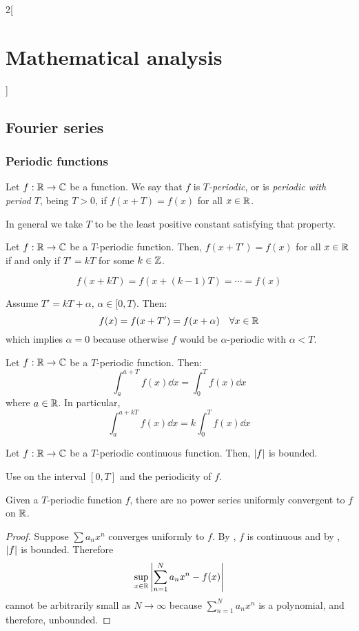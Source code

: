 \documentclass[../../../main_math.tex]{subfiles}
\begin{document}
\begin{multicols}{2}[\section{Mathematical analysis}]
  \subsection{Fourier series}\label{MA:fouriersection}
  \subsubsection{Periodic functions}
  \begin{definition}
    Let $f:\mathbb{R} \rightarrow\mathbb{C} $ be a function. We say that $f$ is \emph{$T$-periodic}, or is \emph{periodic with period $T$}, being $T>0$, if $f(x+T)=f(x)$ for all $x\in\mathbb{R} $.
  \end{definition}
  \begin{remark}
    In general we take $T$ to be the least positive constant satisfying that property.
  \end{remark}
  \begin{lemma}
    Let $f:\mathbb{R} \rightarrow\mathbb{C} $ be a $T$-periodic function. Then, $f(x+T')=f(x)$ for all $x\in\mathbb{R} $ if and only if $T'=kT$ for some $k\in\mathbb{Z} $.
  \end{lemma}
  \begin{sproof}
    \begin{itemizeiff}
      $$f(x+kT)=f(x+(k-1)T)=\cdots=f(x)$$
      \item Assume $T'=kT+\alpha$, $\alpha\in[0,T)$. Then:
      $$f(x)=f(x+T')=f(x+\alpha)\quad\forall x\in\mathbb{R}$$
      which implies $\alpha=0$ because otherwise $f$ would be $\alpha$-periodic with $\alpha<T$.
    \end{itemizeiff}
  \end{sproof}
  \begin{proposition}\label{MA:invarianceperiodicint}
    Let $f:\mathbb{R} \rightarrow\mathbb{C} $ be a $T$-periodic function. Then: $$\int_a^{a+T}f(x)\dd{x}=\int_0^Tf(x)\dd{x}$$ where $a\in\mathbb{R} $. In particular, $$\int_a^{a+kT}f(x)\dd{x}=k\int_0^Tf(x)\dd{x}$$
  \end{proposition}
  \begin{lemma}\label{MA:periodicbounded}
    Let $f:\mathbb{R} \rightarrow\mathbb{C} $ be a $T$-periodic continuous function. Then, $\abs{f}$ is bounded.
  \end{lemma}
  \begin{sproof}
    Use  on the interval $[0,T]$ and the periodicity of $f$.
  \end{sproof}
  \begin{proposition}
    Given a $T$-periodic function $f$, there are no power series uniformly convergent to $f$ on $\mathbb{R}$.
  \end{proposition}
  \begin{proof}
    Suppose $\sum a_nx^n$ converges uniformly to $f$. By , $f$ is continuous and by , $\abs{f}$ is bounded. Therefore $$\sup_{x\in\mathbb{R}}\left|\sum_{n=1}^{N}a_nx^n-f(x)\right|$$
    cannot be arbitrarily small as $N\to\infty$ because $\sum_{n=1}^{N}a_nx^n$ is a polynomial, and therefore, unbounded.
  \end{proof}

\end{multicols}
\end{document}
